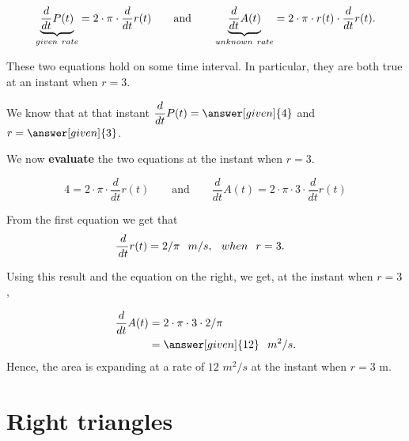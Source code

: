 \documentclass{ximera}
\begin{document}
\begin{example}
\begin{explanation}
    \[
  \underbrace{ \dfrac{d}{dt}P(t)}_{given\hspace{0.05in} rate} = 2\cdot \pi\cdot  \dfrac{d}{dt}r(t)
    \qquad\text{and}\qquad
    \underbrace{ \dfrac{d}{dt}A(t)}_{unknown \hspace{0.05in}rate} = 2\cdot \pi\cdot r(t) \cdot  \dfrac{d}{dt}r(t).
    \]
    
    These two equations hold on some time interval. In particular, they are both true at an instant when $r=3$.
    
   We know  that at that instant $ \dfrac{d}{dt}P(t) =
    \answer[given]{4}$ and $r = \answer[given]{3}$. 
    
    We now \textbf{evaluate}  the two equations at the instant when $r=3$.
    
        \[
    4 = 2\cdot \pi\cdot \dfrac{d}{dt}r(t)
    \qquad\text{and}\qquad
  \dfrac{d}{dt}A(t) = 2\cdot \pi\cdot 3 \cdot \dfrac{d}{dt}r(t) 
    \]
    
    
   From the first equation we get that
    \begin{align*}
     \frac{\,d }{\,d t}r(t)&=  2/\pi \hspace{0.1in} m/s, \hspace{0.1in} when \hspace{0.1in} r=3.    
    \end{align*} 
   
  Using this result and the equation on the right, we get, at the instant when $r=3$,
   
    \begin{align*}
    \dfrac{d}{dt}A(t) &= 2\cdot \pi\cdot 3 \cdot 2/\pi\\
      &=\answer[given]{12}\hspace{0.1in} m^2/s.
    \end{align*}
    Hence, the area is expanding at a rate of $12$ $m^2/s$ at the instant when $r=3$ m.
  \end{explanation}
\end{example}





\section{Right triangles}
\end{document}
